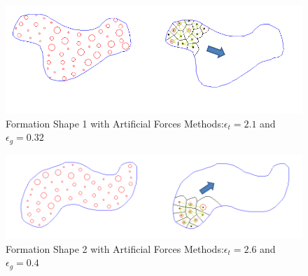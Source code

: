 \documentclass[twoside]{article}
\begin{document}
		\begin{figure}[H]
			\caption{Formation Shape 1 with Artificial Forces Methods:$\epsilon_t = 2.1$ and $\epsilon_g = 0.32$}
			\centerline{\includegraphics[scale = 0.70]{Artificial_Forces_Mesh_1}}
		\end{figure} 		
				\begin{figure}[H]
					\caption{Formation Shape 2 with Artificial Forces Methods:$\epsilon_t = 2.6$ and $\epsilon_g = 0.4$}
					\centerline{\includegraphics[scale = 0.65]{Artificial_Forces_Mesh_2}}
				\end{figure} 		
		
\end{document}
